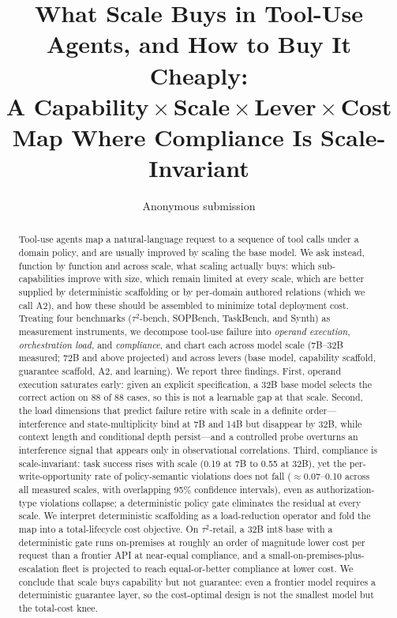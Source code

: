 \documentclass[10pt]{article}
\title{\textbf{What Scale Buys in Tool-Use Agents, and How to Buy It Cheaply:\\
A Capability\,$\times$\,Scale\,$\times$\,Lever\,$\times$\,Cost Map Where Compliance Is Scale-Invariant}}
\author{Anonymous submission}
\date{}
\begin{document}
\maketitle

\begin{abstract}
Tool-use agents map a natural-language request to a sequence of tool calls under a domain policy, and are usually improved by scaling the base model. We ask instead, function by function and across scale, what scaling actually buys: which sub-capabilities improve with size, which remain limited at every scale, which are better supplied by deterministic scaffolding or by per-domain authored relations (which we call A2), and how these should be assembled to minimize total deployment cost. Treating four benchmarks ($\tau^2$-bench, SOPBench, TaskBench, and Synth) as measurement instruments, we decompose tool-use failure into \emph{operand execution}, \emph{orchestration load}, and \emph{compliance}, and chart each across model scale (7B--32B measured; 72B and above projected) and across levers (base model, capability scaffold, guarantee scaffold, A2, and learning). We report three findings. First, operand execution saturates early: given an explicit specification, a 32B base model selects the correct action on 88 of 88 cases, so this is not a learnable gap at that scale. Second, the load dimensions that predict failure retire with scale in a definite order---interference and state-multiplicity bind at 7B and 14B but disappear by 32B, while context length and conditional depth persist---and a controlled probe overturns an interference signal that appears only in observational correlations. Third, compliance is scale-invariant: task success rises with scale (0.19 at 7B to 0.55 at 32B), yet the per-write-opportunity rate of policy-semantic violations does not fall ($\approx$0.07--0.10 across all measured scales, with overlapping 95\% confidence intervals), even as authorization-type violations collapse; a deterministic policy gate eliminates the residual at every scale. We interpret deterministic scaffolding as a load-reduction operator and fold the map into a total-lifecycle cost objective. On $\tau^2$-retail, a 32B int8 base with a deterministic gate runs on-premises at roughly an order of magnitude lower cost per request than a frontier API at near-equal compliance, and a small-on-premises-plus-escalation fleet is projected to reach equal-or-better compliance at lower cost. We conclude that scale buys capability but not guarantee: even a frontier model requires a deterministic guarantee layer, so the cost-optimal design is not the smallest model but the total-cost knee.
\end{abstract}
\end{document}
